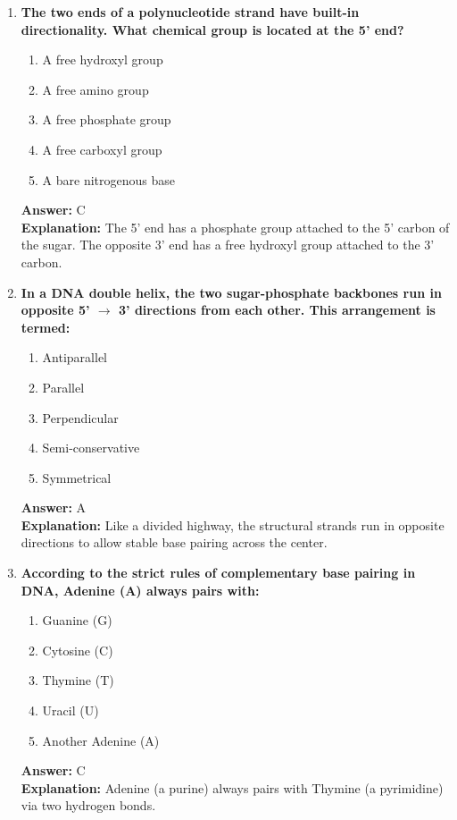 \documentclass[11pt, a4paper]{article}
\begin{document}
\begin{enumerate}
\item \textbf{The two ends of a polynucleotide strand have built-in directionality. What chemical group is located at the 5' end?}
\begin{enumerate}[label=\Alph*.]
    \item A free hydroxyl group
    \item A free amino group
    \item A free phosphate group
    \item A free carboxyl group
    \item A bare nitrogenous base
\end{enumerate}
\textbf{Answer:} C \\
\textbf{Explanation:} The 5' end has a phosphate group attached to the 5' carbon of the sugar. The opposite 3' end has a free hydroxyl group attached to the 3' carbon.

\item \textbf{In a DNA double helix, the two sugar-phosphate backbones run in opposite 5' $\rightarrow$ 3' directions from each other. This arrangement is termed:}
\begin{enumerate}[label=\Alph*.]
    \item Antiparallel
    \item Parallel
    \item Perpendicular
    \item Semi-conservative
    \item Symmetrical
\end{enumerate}
\textbf{Answer:} A \\
\textbf{Explanation:} Like a divided highway, the structural strands run in opposite directions to allow stable base pairing across the center.

\item \textbf{According to the strict rules of complementary base pairing in DNA, Adenine (A) always pairs with:}
\begin{enumerate}[label=\Alph*.]
    \item Guanine (G)
    \item Cytosine (C)
    \item Thymine (T)
    \item Uracil (U)
    \item Another Adenine (A)
\end{enumerate}
\textbf{Answer:} C \\
\textbf{Explanation:} Adenine (a purine) always pairs with Thymine (a pyrimidine) via two hydrogen bonds.


\end{enumerate}
\end{document}
